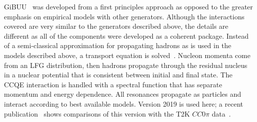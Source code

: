 GiBUU~\cite{Buss:2011mx} was developed from a first principles approach as opposed to the greater emphasis on empirical models with other generators.
Although the interactions covered are very similar to the generators described above, the details are different as all of the components were developed as a coherent package.
Instead of a semi-classical approximation for propagating hadrons as is used in the models described above, a transport equation is solved~\cite{Buss:2011mx}.
Nucleon momenta come from an LFG distribution, then hadrons propagate through the residual nucleus in a nuclear potential that is consistent between initial and final state.
The CCQE interaction is handled with a spectral function that has separate momentum and energy dependence.
All resonances propagate as particles and interact according to best available models.   
Version 2019 is used here; a recent publication~\cite{Mosel:2017ssx} shows comparisons of this version with the T2K $CC0\pi$ data~\cite{Abe:2018pwo}.


